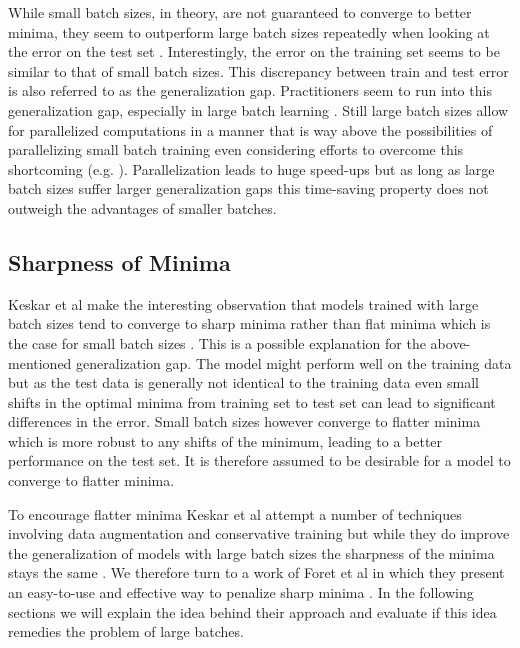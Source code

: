 \documentclass[10pt,conference,compsocconf]{IEEEtran}
\begin{document}
While small batch sizes, in theory, are not guaranteed to converge to better minima, they seem to outperform large batch sizes repeatedly when looking at the error on the test set \cite{keskar2017largebatch}. Interestingly, the error on the training set seems to be similar to that of small batch sizes. This discrepancy between train and test error is also referred to as the generalization gap. Practitioners seem to run into this generalization gap, especially in large batch learning \cite{lecunEfficientBackProp2012}. Still large batch sizes allow for parallelized computations in a manner that is way above the possibilities of parallelizing small batch training even considering efforts to overcome this shortcoming (e.g. \cite{dasDistributedDeepLearning2016}). Parallelization leads to huge speed-ups but as long as large batch sizes suffer larger generalization gaps this time-saving property does not outweigh the advantages of smaller batches.

\subsection{Sharpness of Minima}
\label{subsec:sharpness}
Keskar et al make the interesting observation that models trained with large batch sizes tend to converge to sharp minima rather than flat minima which is the case for small batch sizes \cite{keskar2017largebatch}. This is a possible explanation for the above-mentioned generalization gap. The model might perform well on the training data but as the test data is generally not identical to the training data even small shifts in the optimal minima from training set to test set can lead to significant differences in the error. Small batch sizes however converge to flatter minima which is more robust to any shifts of the minimum, leading to a better performance on the test set. It is therefore assumed to be desirable for a model to converge to flatter minima.

To encourage flatter minima Keskar et al attempt a number of techniques involving data augmentation and conservative training but while they do improve the generalization of models with large batch sizes the sharpness of the minima stays the same \cite{keskar2017largebatch}. We therefore turn to a work of Foret et al in which they present an easy-to-use and effective way to penalize sharp minima \cite{foret2021sharpnessaware}. In the following sections we will explain the idea behind their approach and evaluate if this idea remedies the problem of large batches.
\end{document}
